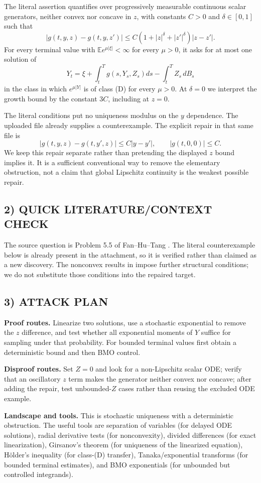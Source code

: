 \documentclass[11pt,a4paper]{article}
\newcommand{\E}{\mathbb E}
\theoremstyle{definition}
\begin{document}
The literal assertion quantifies over progressively measurable continuous scalar generators, neither convex nor concave in $z$, with constants $C>0$ and $\delta\in[0,1]$ such that
\[
 |g(t,y,z)-g(t,y,z')|\le C(1+|z|^\delta+|z'|^\delta)|z-z'|.
\]
For every terminal value with $\E e^{\mu|\xi|}<\infty$ for every $\mu>0$, it asks for at most one solution of
\[
 Y_t=\xi+\int_t^Tg(s,Y_s,Z_s)ds-\int_t^TZ_s\,dB_s
\]
in the class in which $e^{\mu|Y|}$ is of class (D) for every $\mu>0$. At $\delta=0$ we interpret the growth bound by the constant $3C$, including at $z=0$.

The literal conditions put no uniqueness modulus on the $y$ dependence. The uploaded file already supplies a counterexample. The explicit repair in that same file is
\[
 |g(t,y,z)-g(t,y',z)|\le C|y-y'|,
 \qquad |g(t,0,0)|\le C.
\]
We keep this repair separate rather than pretending the displayed $z$ bound implies it. It is a sufficient conventional way to remove the elementary obstruction, not a claim that global Lipschitz continuity is the weakest possible repair.

\subsection*{2) QUICK LITERATURE/CONTEXT CHECK}
The source question is Problem 5.5 of Fan--Hu--Tang \cite{FHT}. The literal counterexample below is already present in the attachment, so it is verified rather than claimed as a new discovery. The nonconvex results in \cite{FHTnonconvex,WZF} impose further structural conditions; we do not substitute those conditions into the repaired target.

\subsection*{3) ATTACK PLAN}
\textbf{Proof routes.} Linearize two solutions, use a stochastic exponential to remove the $z$ difference, and test whether all exponential moments of $Y$ suffice for sampling under that probability. For bounded terminal values first obtain a deterministic bound and then BMO control.

\textbf{Disproof routes.} Set $Z=0$ and look for a non-Lipschitz scalar ODE; verify that an oscillatory $z$ term makes the generator neither convex nor concave; after adding the repair, test unbounded-$Z$ cases rather than reusing the excluded ODE example.

\textbf{Landscape and tools.} This is stochastic uniqueness with a deterministic obstruction. The useful tools are separation of variables (for delayed ODE solutions), radial derivative tests (for nonconvexity), divided differences (for exact linearization), Girsanov's theorem (for uniqueness of the linearized equation), H\"older's inequality (for class-(D) transfer), Tanaka/exponential transforms (for bounded terminal estimates), and BMO exponentials (for unbounded but controlled integrands).
\end{document}
